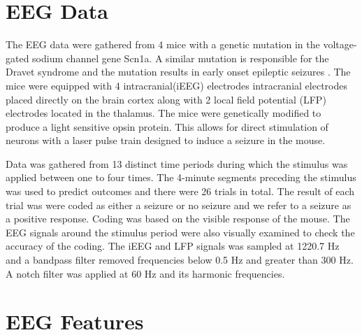 \section{EEG Data}

The EEG data were gathered from 4 mice with a genetic 
mutation in the voltage-gated sodium channel gene Scn1a. 
A similar mutation is responsible for the Dravet syndrome 
and the mutation results in early onset epileptic seizures \cite{ito2013}.
The mice were equipped with 4 intracranial(iEEG) electrodes \textemdash intracranial electrodes placed directly on the brain cortex \textemdash
along with 2 local field potential (LFP) electrodes located 
 in the thalamus. The mice were genetically modified to produce a 
 light sensitive opsin protein. This allows for direct 
 stimulation of neurons with a laser pulse train designed
 to induce a seizure in the mouse.
 

Data was gathered from 13 distinct time periods during which the 
stimulus was applied between one to four times. 
The 4-minute segments preceding the stimulus was used 
to predict outcomes and there were 26 trials in total.
 The result of each trial was were coded as either a seizure 
 or no seizure and we refer to a seizure as a positive response. 
Coding was based on the visible response of the 
mouse. The EEG signals around the stimulus period were also visually examined to check the accuracy of the coding.
The iEEG and LFP signals was sampled at 1220.7 Hz and
a bandpass filter removed frequencies below 0.5 Hz and greater
than 300 Hz. A notch filter was applied at 60 Hz and its harmonic frequencies. 


\section{EEG Features}

